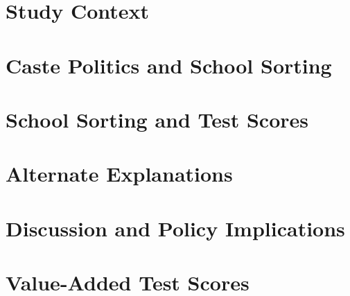 \documentclass[11pt]{article}
\begin{document}
	

\section{Study Context}\label{context}

	

\section{Caste Politics and School Sorting}\label{sorting} %

	


\section{School Sorting and Test Scores}\label{scores}

	


\section{Alternate Explanations}\label{alternates}

	

\section{Discussion and Policy Implications}\label{conclusion}

	



\pagebreak

	
	

\appendix

\section{Value-Added Test Scores}\label{appendix_valueadded}

	
\end{document}
